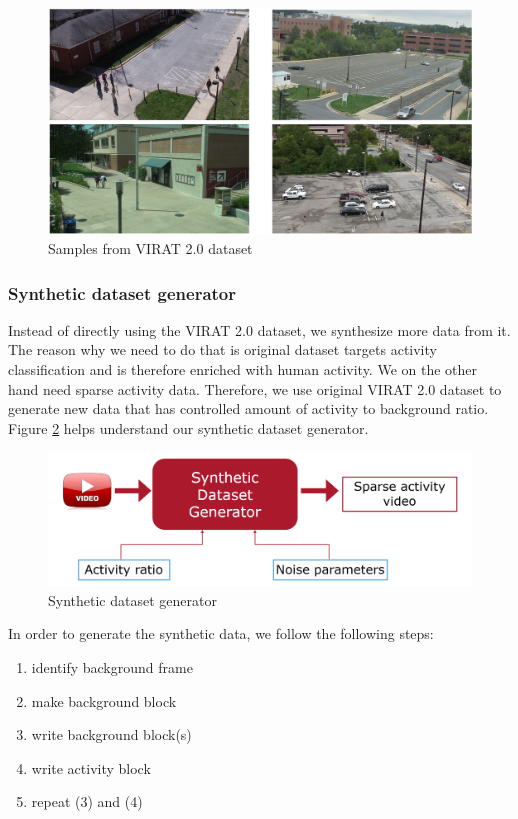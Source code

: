 \begin{figure}
    \centering
    \includegraphics[width=\linewidth]{images/virat-samples.PNG}
    \caption[Samples from VIRAT 2.0 dataset ]{Samples from VIRAT 2.0\cite{virat20} dataset }
    \label{fig:virat-samples}
\end{figure}


\subsubsection{Synthetic dataset generator}
\label{sec:synthetic-dataset}
Instead of directly using the VIRAT 2.0 dataset, we synthesize more data from it. The reason why we need to do that is original dataset targets activity classification and is therefore enriched with human activity. We on the other hand need sparse activity data. Therefore, we use original VIRAT 2.0 dataset to generate new data that has controlled amount of activity to background ratio. Figure \ref{fig:synthetic-dataset-generator} helps understand our synthetic dataset generator.  

\begin{figure}
    \centering
    \includegraphics[width=\linewidth]{images/synthetic-dataset-generator.PNG}
    \caption{Synthetic dataset generator}
    \label{fig:synthetic-dataset-generator}
\end{figure}

In order to generate the synthetic data, we follow the following steps:
\begin{enumerate} 
    \item identify background frame
    \item make background block
    \item write background block(s)
    \item write activity block
    \item repeat (3) and (4)
\end{enumerate}

